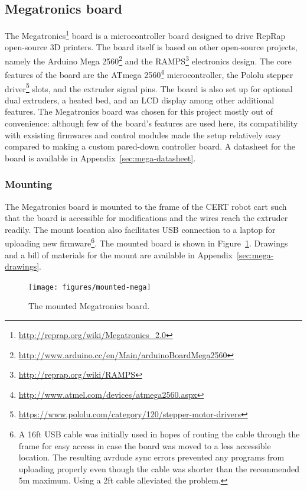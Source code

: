 \subsection{Megatronics board}
The Megatronics\footnote{\url{http://reprap.org/wiki/Megatronics_2.0}} board is a microcontroller board designed to drive RepRap open-source 3D printers. The board itself is based on other open-source projects, namely the Arduino Mega 2560\footnote{\url{http://www.arduino.cc/en/Main/arduinoBoardMega2560}} and the RAMPS\footnote{\url{http://reprap.org/wiki/RAMPS}} electronics design. The core features of the board are the ATmega 2560\footnote{\url{http://www.atmel.com/devices/atmega2560.aspx}} microcontroller, the Pololu stepper driver\footnote{\url{https://www.pololu.com/category/120/stepper-motor-drivers}} slots, and the extruder signal pins. The board is also set up for optional dual extruders, a heated bed, and an LCD display among other additional features. The Megatronics board was chosen for this project mostly out of convenience: although few of the board's features are used here, its compatibility with exsisting firmwares and control modules made the setup relatively easy compared to making a custom pared-down controller board. A datasheet for the board is available in Appendix~\ref{sec:mega-datasheet}.

\subsubsection{Mounting}
The Megatronics board is mounted to the frame of the CERT robot cart such that the board is accessible for modifications and the wires reach the extruder readily. The mount location also facilitates USB connection to a laptop for uploading new firmware\footnote{A 16ft USB cable was initially used in hopes of routing the cable through the frame for easy access in case the board was moved to a less accessible location. The resulting avrdude sync errors prevented any programs from uploading properly even though the cable was shorter than the recommended 5m maximum. Using a 2ft cable alleviated the problem.}. The mounted board is shown in Figure~\ref{fig:mounted-mega}. Drawings and a bill of materials for the mount are available in Appendix~\ref{sec:mega-drawings}.

\begin{figure}
    \centering
    \texttt{[image: figures/mounted-mega]}
    \caption{The mounted Megatronics board.}
    \label{fig:mounted-mega}
\end{figure}

